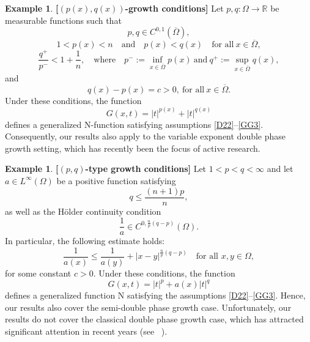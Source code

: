 \documentclass[10pt,reqno]{amsart}
\newcommand *\w{^\wedge}
\theoremstyle{definition}
\newtheorem{example}[thm]{Example}
\numberwithin{equation}{section}
\begin{document}
\begin{example}{\rm\bf{[\((p(x),q(x))\)-growth conditions]}} \label{ex6}
Let \(p, q: \Omega \rightarrow \mathbb{R}\) be measurable functions such that
\begin{equation}\label{var20}
p,q\in C^{0,1}(\overline{\Omega}),
\end{equation}
\begin{equation}\label{var21}
1<p(x)<n\quad \text{and}\quad p(x)<q(x)\quad \text{for all}\ x \in \overline{\Omega},
\end{equation}
\begin{equation}\label{var22}
\frac{q^+}{p^-}<1+\frac{1}{n}, \quad \text{where}\quad p^- := \inf_{x \in \overline{\Omega}} p(x)\ \text{and}\ q^+ := \sup_{x \in \overline{\Omega}} q(x),
\end{equation}
and
\begin{equation}\label{double22}
   q(x)-p(x)=c>0,\ \text{for all}\ x\in \overline{\Omega}.
\end{equation}
Under these conditions, the function
\[
G(x,t) = |t|^{p(x)} +|t|^{q(x)}
\]
defines a generalized \textnormal{N}-function satisfying assumptions \eqref{D22}--\eqref{GG3}. Consequently, our results also apply to the variable exponent double phase growth setting, which has recently been the focus of active research.
\end{example}
\begin{example}{\rm\bf{[\((p,q)\)-type growth conditions]}} \label{ex5}
Let \(1 < p < q < \infty\) and let \(a \in L^\infty(\Omega)\) be a positive function satisfying
\begin{equation}\label{double2}
    q \leq \frac{(n+1)p}{n},
\end{equation}
as well as the Hölder continuity condition
\begin{equation}\label{double3}
    \frac{1}{a} \in C^{0, \frac{n}{p}(q - p)}(\Omega).
\end{equation}
In particular, the following estimate holds:
\begin{equation}\label{double5}
    \frac{1}{a(x)} \leq  \frac{1}{a(y)} + |x - y|^{\frac{n}{p}(q - p)}  \quad \text{for all } x, y \in \Omega,
\end{equation}
for some constant \(c > 0\). Under these conditions, the function
\[
G(x,t) = |t|^p + a(x)|t|^q
\]
defines a generalized function \textnormal{N} satisfying the assumptions \eqref{D22}--\eqref{GG3}. Hence, our results also cover the semi-double phase growth case. Unfortunately, our results do not cover the classical double phase growth case, which has attracted significant attention in recent years (see ~\cite{Colombo2015}).
\end{example}
\end{document}
